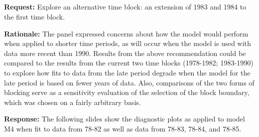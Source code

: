 \documentclass[ xcolor = pdftex, dvipsnames, table ]{beamer}
\begin{document}
\subsection{}
\begin{frame}
\small
\textbf{Request:}  
Explore an alternative time block: an extension of 1983 and 1984 to the first 
time block.

\textbf{Rationale:}
The panel expressed concerns about how the model would perform when applied to 
shorter time periods, as will occur when the model is used with data more 
recent than 1990.  Results from the above recommendation could be compared to 
the results from the current two time blocks (1978-1982; 1983-1990) to explore 
how fits to data from the late period degrade when the model for the late 
period is based on fewer years of data.  Also, comparisons of the two forms of 
blocking serve as a sensitivity evaluation of the selection of the block 
boundary, which was chosen on a fairly arbitrary basis.

\textbf{Response:} 
The following slides show the diagnostic plots as applied to model M4 when fit 
to data from 78-82 as well as data from 78-83, 78-84, and 78-85.

\end{frame}

%
%
\end{document}
